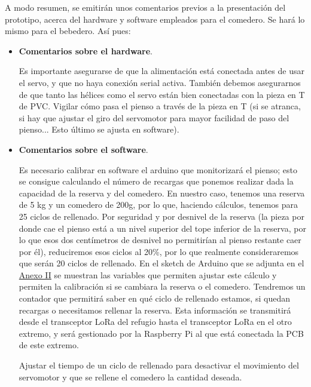 \documentclass[12pt]{article}
\begin{document}
	\pagebreak 
	
	\noindent A modo resumen, se emitirán unos comentarios previos a la presentación del prototipo, acerca del hardware y software empleados para el comedero. Se hará lo mismo para el bebedero. Así pues:
	
	\begin{itemize}
		\item \textbf{Comentarios sobre el hardware}.
		\begin{outline}
			\1 Es importante asegurarse de que la alimentación está conectada antes de usar el servo, y que no haya conexión serial activa.
			\1 También debemos asegurarnos de que tanto las hélices como el servo están bien conectadas con la pieza en T de PVC. 
			\1 Vigilar cómo pasa el pienso a través de la pieza en T (si se atranca, si hay que ajustar el giro del servomotor para mayor facilidad de paso del pienso... Esto último se ajusta en software). 
		\end{outline}	
		\item \textbf{Comentarios sobre el software}.
		\begin{outline}
			\1 Es necesario calibrar en software el arduino que monitorizará el pienso; esto se consigue calculando el número de recargas que ponemos realizar dada la capacidad de la reserva y del comedero. En nuestro caso, tenemos una reserva de 5 kg y un comedero de 200g, por lo que, haciendo cálculos, tenemos para 25 ciclos de rellenado. Por seguridad y por desnivel de la reserva (la pieza por donde cae el pienso está a un nivel superior del tope inferior de la reserva, por lo que esos dos centímetros de desnivel no permitirían al pienso restante caer por él), reduciremos esos ciclos al 20\%, por lo que realmente consideraremos que serán 20 ciclos de rellenado. En el sketch de Arduino que se adjunta en el  \hyperref[anexo II: codigo]{Anexo II} se muestran las variables que permiten ajustar este cálculo y permiten la calibración si se cambiara la reserva o el comedero. Tendremos un contador que permitirá saber en qué ciclo de rellenado estamos, si quedan recargas o necesitamos rellenar la reserva. Esta información se transmitirá desde el transceptor LoRa del refugio hasta el transceptor LoRa en el otro extremo, y será gestionado por la Raspberry Pi al que está conectada la PCB de este extremo.
			
			\1 Ajustar el tiempo de un ciclo de rellenado para desactivar el movimiento del servomotor y que se rellene el comedero la cantidad deseada. \\
		\end{outline}
	
	\end{itemize}
\end{document}
